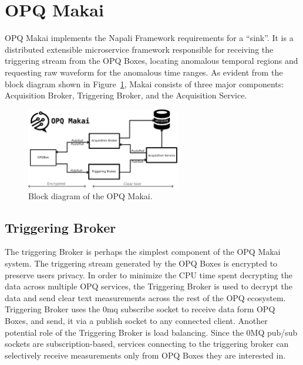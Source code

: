\section{OPQ Makai}\label{sec:opq-makai}

OPQ Makai implements the Napali Framework requirements for a ``sink''.
 It is a distributed extensible microservice framework responsible for receiving the triggering stream from the OPQ Boxes, locating anomalous temporal regions and requesting raw waveform for the anomalous time ranges.
 As evident from the block diagram shown in Figure~\ref{fig:opq:10}, Makai consists of three major components: Acquisition Broker, Triggering Broker, and the Acquisition Service.
\begin{figure}[h]
  \begin{center}
  \includegraphics[width=0.6\textwidth]{img/makai_main.pdf}
  \end{center}
  \caption{Block diagram of the OPQ Makai.}
  \label{fig:opq:10}
\end{figure}

\subsection{Triggering Broker}\label{subsec:triggering-broker}

The triggering Broker is perhaps the simplest component of the OPQ Makai system.
The triggering stream generated by the OPQ Boxes is encrypted to preserve users privacy.
In order to minimize the CPU time spent decrypting the data across multiple OPQ services, the Triggering Broker is used to decrypt the data and send clear text measurements across the rest of the OPQ ecosystem.
Triggering Broker uses the 0mq subscribe socket to receive data form OPQ Boxes, and send, it via a publish socket to any connected client.
Another potential role of the Triggering Broker is load balancing.
Since the 0MQ pub/sub sockets are subscription-based, services connecting to the triggering broker can selectively receive measurements only from OPQ Boxes they are interested in.

